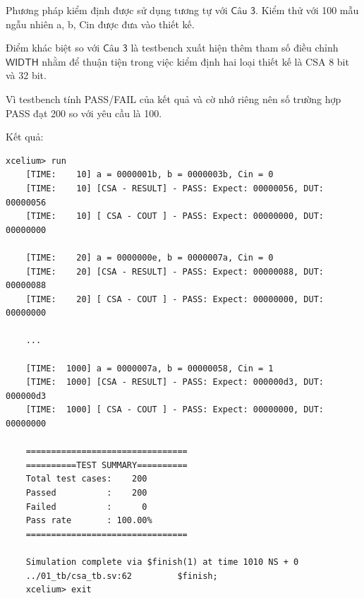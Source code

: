 
Phương pháp kiểm định được sử dụng tương tự với $\textsf{Câu 3}$. Kiểm thử với 100 mẫu ngẫu nhiên {a, b, Cin} được đưa vào thiết kế.



Điểm khác biệt so với $\textsf{Câu 3}$ là testbench xuất hiện thêm tham số điều chỉnh $\textsf{WIDTH}$ nhằm để thuận tiện trong việc kiểm định hai loại thiết kế là CSA 8 bit và 32 bit. 

Vì testbench tính PASS/FAIL của kết quả và cờ nhớ riêng nên số trường hợp PASS đạt 200 so với yêu cầu là 100.

Kết quả:

\begin{lstlisting}[style=StyleResult, language=Result, caption={Kết quả kiểm định cho thiết kế CSA 8 bit.}]
	xcelium> run
	[TIME:    10] a = 0000001b, b = 0000003b, Cin = 0
	[TIME:    10] [CSA - RESULT] - PASS: Expect: 00000056, DUT: 00000056 
	[TIME:    10] [ CSA - COUT ] - PASS: Expect: 00000000, DUT: 00000000 
	
	[TIME:    20] a = 0000000e, b = 0000007a, Cin = 0
	[TIME:    20] [CSA - RESULT] - PASS: Expect: 00000088, DUT: 00000088 
	[TIME:    20] [ CSA - COUT ] - PASS: Expect: 00000000, DUT: 00000000 
	
	...
	
	[TIME:  1000] a = 0000007a, b = 00000058, Cin = 1
	[TIME:  1000] [CSA - RESULT] - PASS: Expect: 000000d3, DUT: 000000d3 
	[TIME:  1000] [ CSA - COUT ] - PASS: Expect: 00000000, DUT: 00000000 
	
	================================
	==========TEST SUMMARY==========
	Total test cases:    200    
	Passed          :    200    
	Failed          :      0    
	Pass rate       : 100.00%
	================================
	
	Simulation complete via $finish(1) at time 1010 NS + 0
	../01_tb/csa_tb.sv:62         $finish;
	xcelium> exit
\end{lstlisting}


